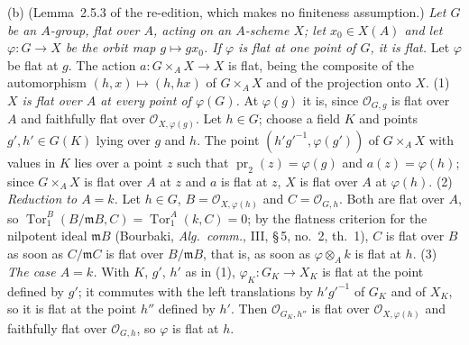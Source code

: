 (b) (Lemma~2.5.3 of the re-edition, which makes no finiteness assumption.) \emph{Let \(G\) be an
\(A\)-group, flat over \(A\), acting on an \(A\)-scheme \(X\); let \(x_0\in X(A)\) and let
\(\varphi\colon G\to X\) be the orbit map \(g\mapsto gx_0\). If \(\varphi\) is flat at one point of
\(G\), it is flat.} Let \(\varphi\) be flat at \(g\). The action \(a\colon G\times_AX\to X\) is flat,
being the composite of the automorphism \((h,x)\mapsto(h,hx)\) of \(G\times_AX\) and of the
projection onto \(X\). (1) \emph{\(X\) is flat over \(A\) at every point of \(\varphi(G)\).} At
\(\varphi(g)\) it is, since \(\mathcal O_{G,g}\) is flat over \(A\) and faithfully flat over
\(\mathcal O_{X,\varphi(g)}\). Let \(h\in G\); choose a field \(K\) and points \(g',h'\in G(K)\) lying
over \(g\) and \(h\). The point \((h'g'^{-1},\varphi(g'))\) of \(G\times_AX\) with values in \(K\) lies
over a point \(z\) such that \(\operatorname{pr}_2(z)=\varphi(g)\) and \(a(z)=\varphi(h)\); since
\(G\times_AX\) is flat over \(A\) at \(z\) and \(a\) is flat at \(z\), \(X\) is flat over \(A\) at
\(\varphi(h)\). (2) \emph{Reduction to \(A=k\).} Let \(h\in G\), \(B=\mathcal O_{X,\varphi(h)}\) and
\(C=\mathcal O_{G,h}\). Both are flat over \(A\), so
\(\operatorname{Tor}^B_1(B/\mathfrak mB,C)=\operatorname{Tor}^A_1(k,C)=0\); by the flatness criterion
for the nilpotent ideal \(\mathfrak mB\) (Bourbaki, \emph{Alg.\ comm.}, III, \S\,5, no.~2, th.~1),
\(C\) is flat over \(B\) as soon as \(C/\mathfrak mC\) is flat over \(B/\mathfrak mB\), that is, as
soon as \(\varphi\otimes_Ak\) is flat at \(h\). (3) \emph{The case \(A=k\).} With \(K\), \(g'\),
\(h'\) as in (1), \(\varphi_K\colon G_K\to X_K\) is flat at the point defined by \(g'\); it commutes
with the left translations by \(h'g'^{-1}\) of \(G_K\) and of \(X_K\), so it is flat at the point
\(h''\) defined by \(h'\). Then \(\mathcal O_{G_K,h''}\) is flat over \(\mathcal O_{X,\varphi(h)}\)
and faithfully flat over \(\mathcal O_{G,h}\), so \(\varphi\) is flat at \(h\).

